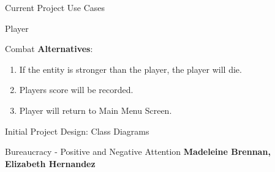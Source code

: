 \documentclass[12pt]{report}
\begin{document}
\begin{chapter}{Current Project Use Cases}
\begin{section}{Player}
\begin{subsection}{Combat}
      \textbf{Alternatives}:
      \begin{enumerate}
        \item If the entity is stronger than the player, the player will die.
        \item Players score will be recorded.
        \item Player will return to Main Menu Screen.
      \end{enumerate}
     \end{subsection}
    \end{section}
  \end{chapter}
  
  
  \begin{chapter}{Initial Project Design: Class Diagrams}
   \begin{section}{Bureaucracy - Positive and Negative Attention}
    \textbf{Madeleine Brennan, Elizabeth Hernandez}\\


\end{section}
\end{chapter}
\end{document}
